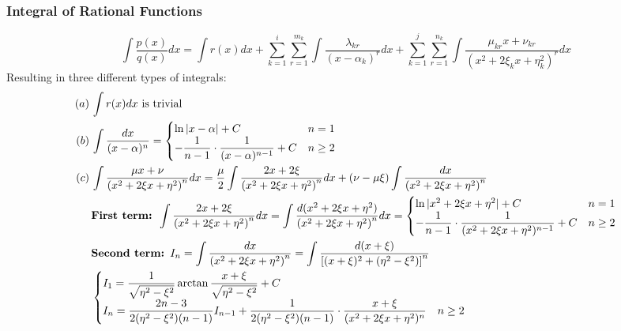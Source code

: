 \documentclass{article}
\newcommand{\0}{{\bf{0}}}
\begin{document}
\subsubsection{Integral of Rational Functions}
$$\int\frac{p(x)}{q(x)}dx=\int r(x)dx+\sum_{k=1}^i\sum_{r=1}^{m_k}\int\frac{\lambda_{kr}}{(x-\alpha_k)^r}dx+\sum_{k=1}^j\sum_{r=1}^{n_k}\int\frac{\mu_{kr}x+\nu_{kr}}{(x^2+2\xi_kx+\eta_k^2)^r}dx$$
Resulting in three different types of integrals:
\begin{equation}
\begin{split}
    (a)\,&\int r(x)dx\mbox{ is trivial}\\
    (b)\,&\int\frac{dx}{(x-\alpha)^n}=\begin{cases}
        \ln|x-\alpha|+C&n=1\\
        -\dfrac{1}{n-1}\cdot\dfrac{1}{(x-\alpha)^{n-1}}+C&n\geq2
    \end{cases}\\
    (c)\,&\int\frac{\mu x+\nu}{\left(x^2+2\xi x+\eta^2\right)^n}dx=\frac{\mu}{2}\int\frac{2x+2\xi}{\left(x^2+2\xi x+\eta^2\right)^n}dx+(\nu-\mu\xi)\int\frac{dx}{\left(x^2+2\xi x+\eta^2\right)^n}\\
    &\mbox{\textbf{First term: }}\int\frac{2x+2\xi}{\left(x^2+2\xi x+\eta^2\right)^n}dx=\int\frac{d(x^2+2\xi x+\eta^2)}{\left(x^2+2\xi x+\eta^2\right)^n}dx=\begin{cases}
        \ln|x^2+2\xi x+\eta^2|+C&n=1\\
        -\dfrac{1}{n-1}\cdot\dfrac{1}{(x^2+2\xi x+\eta^2)^{n-1}}+C&n\geq2
    \end{cases}\\
    &\mbox{\textbf{Second term: }}I_n=\int\frac{dx}{\left(x^2+2\xi x+\eta^2\right)^n}=\int\frac{d(x+\xi)}{\left[(x+\xi)^2+(\eta^2-\xi^2)\right]^n}\\
    &\begin{cases}
        I_1=\dfrac{1}{\sqrt{\eta^2-\xi^2}}\arctan\dfrac{x+\xi}{\sqrt{\eta^2-\xi^2}}+C\\
        I_n=\dfrac{2n-3}{2(\eta^2-\xi^2)(n-1)}I_{n-1}+\dfrac{1}{2(\eta^2-\xi^2)(n-1)}\cdot\dfrac{x+\xi}{(x^2+2\xi x+\eta^2)^n}&n\geq2
    \end{cases}
\end{split}
\end{equation}
\end{document}
